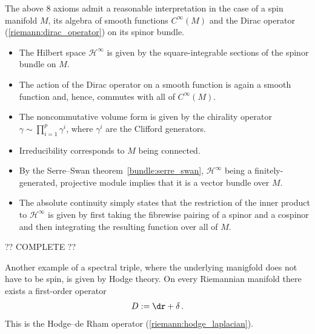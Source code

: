     \begin{example}
        The above 8 axioms admit a reasonable interpretation in the case of a spin manifold $M$, its algebra of smooth functions $C^\infty(M)$ and the Dirac operator (\cref{riemann:dirac_operator}) on its spinor bundle.
        \begin{itemize}
            \item The Hilbert space $\mathcal{H}^\infty$ is given by the square-integrable sections of the spinor bundle on $M$.
            \item The action of the Dirac operator on a smooth function is again a smooth function and, hence, commutes with all of $C^\infty(M)$.
            \item The noncommutative volume form is given by the chirality operator $\gamma\sim\prod_{i=1}^p\gamma^i$, where $\gamma^i$ are the Clifford generators.
            \item Irreducibility corresponds to $M$ being connected.
            \item By the Serre--Swan theorem~\ref{bundle:serre_swan}, $\mathcal{H}^\infty$ being a finitely-generated, projective module implies that it is a vector bundle over $M$.
            \item The absolute continuity simply states that the restriction of the inner product to $\mathcal{H}^\infty$ is given by first taking the fibrewise pairing of a spinor and a cospinor and then integrating the resulting function over all of $M$.
        \end{itemize}
        ?? COMPLETE ??
    \end{example}
    \begin{example}
        Another example of a spectral triple, where the underlying manigfold does not have to be spin, is given by Hodge theory. On every Riemannian manifold there exists a first-order operator
        \begin{gather}
            D:=\dr+\delta\,.
        \end{gather}
        This is the Hodge--de Rham operator (\cref{riemann:hodge_laplacian}).
    \end{example}

